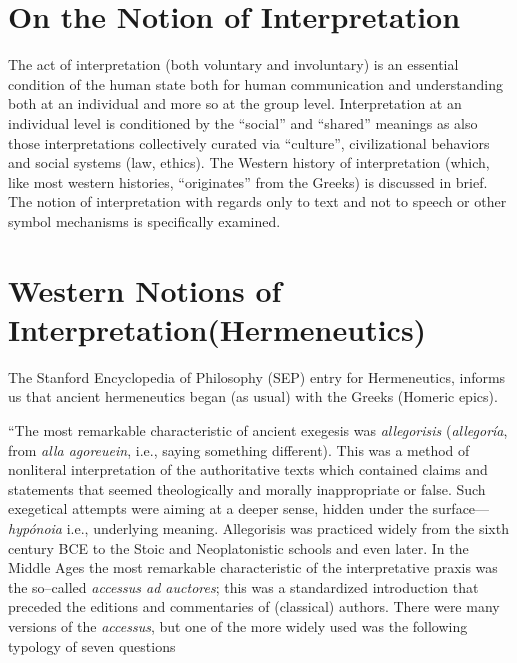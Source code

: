 \section*{On the Notion of Interpretation}

The act of interpretation (both voluntary and involuntary) is an essential condition of the human state both for human communication and understanding both at an individual and more so at the group level. Interpretation at an individual level is conditioned by the “social” and “shared” meanings as also those interpretations collectively curated via “culture”, civilizational behaviors and social systems (law, ethics). The Western history of interpretation (which, like most western histories, “originates” from the Greeks) is discussed in brief. The notion of interpretation with regards only to text and not to speech or other symbol mechanisms is specifically examined.


\section*{Western Notions of Interpretation\hfil \break (Hermeneutics)}

The Stanford Encyclopedia of Philosophy (SEP) entry for Herme\-neutics, informs us that ancient hermeneutics began (as usual) with the Greeks (Homeric epics).

\begin{myquote}
“The most remarkable characteristic of ancient exegesis was \textit{allegorisis} (\textit{allegoría}, from \textit{alla agoreuein}, i.e., saying something different). This was a method of nonliteral interpretation of the authoritative texts which contained claims and statements that seemed theologically and morally inappropriate or false. Such exegetical attempts were aiming at a deeper sense, hidden under the surface—\textit{hypónoia} i.e., underlying meaning. Allegorisis was practiced widely from the sixth century BCE to the Stoic and Neoplatonistic schools and even later. In the Middle Ages the most remarkable characteristic of the interpretative praxis was the so–called \textit{accessus ad auctores}; this was a standardized introduction that preceded the editions and commentaries of (classical) authors. There were many versions of the \textit{accessus}, but one of the more widely used was the following typology of seven questions 
\end{myquote}

